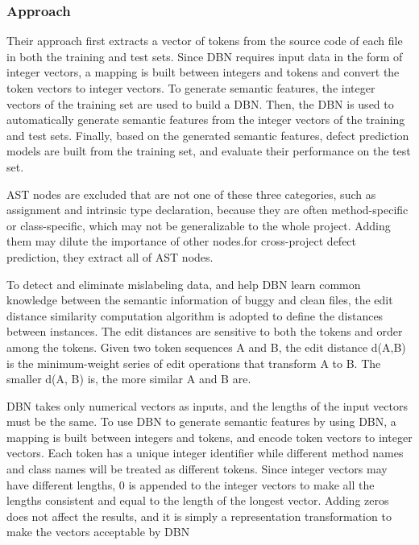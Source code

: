 \documentclass{article}
\begin{document}
\subsubsection{Approach}
Their approach first extracts a vector of tokens from the source code of each file in both the training and test sets. Since DBN requires input data in the form of integer vectors, a mapping is built between integers and tokens and convert the token vectors to integer vectors. To generate semantic features, the integer vectors of the training set are used to build a DBN. Then, the DBN is used to automatically generate semantic features from the integer vectors of the training and test sets. Finally, based on the generated semantic features, defect prediction models are built from the training set, and evaluate their performance on the test set.

AST nodes are excluded that are not one of these three categories, such as assignment and intrinsic type declaration, because they are often method-specific or class-specific, which may not be generalizable to the whole project. Adding them may dilute the importance of other nodes.for cross-project defect prediction, they extract all of AST nodes.

To detect and eliminate mislabeling data, and help DBN learn common knowledge between the semantic information of buggy and clean files, the edit distance similarity computation algorithm is adopted to define the distances between instances. The edit distances are sensitive to both the tokens and order among the tokens. Given two token sequences A and B, the edit distance d(A,B) is the minimum-weight series of edit operations that transform A to B. The smaller d(A, B) is, the more similar A and B are.

DBN takes only numerical vectors as inputs, and the lengths of the input vectors must be the same. To use DBN to generate semantic features by using DBN, a mapping is built between integers and tokens, and encode token vectors to integer vectors. Each token has a unique integer identifier while different method names and class names will be treated as different tokens. Since integer vectors may have different lengths, 0 is appended to the integer vectors to make all the lengths consistent and equal to the length of the longest vector. Adding zeros does not affect the results, and it is simply a representation transformation to make the vectors acceptable by DBN
\end{document}
